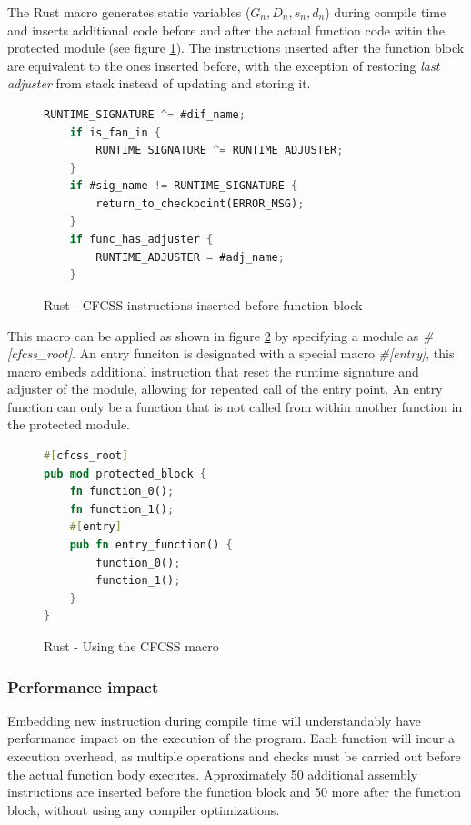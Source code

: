 The Rust macro generates static variables ({$G_n, D_n, s_n, d_n$}) during compile time and inserts additional code before and after the actual function code witin the protected module (see figure \ref{fig:rust_cfcss_macro}). The instructions inserted after the function block are equivalent to the ones inserted before, with the exception of restoring \textit{last adjuster} from stack instead of updating and storing it.

\begin{figure}[!h]
    \begin{lstlisting}[language=Rust]
    RUNTIME_SIGNATURE ^= #dif_name;
    if is_fan_in {
        RUNTIME_SIGNATURE ^= RUNTIME_ADJUSTER;
    }
    if #sig_name != RUNTIME_SIGNATURE {
        return_to_checkpoint(ERROR_MSG);
    }
    if func_has_adjuster {
        RUNTIME_ADJUSTER = #adj_name;
    }
    \end{lstlisting}
    \caption{Rust - CFCSS instructions inserted before function block}
    \label{fig:rust_cfcss_macro}
    \end{figure}

This macro can be applied as shown in figure \ref{fig:rust_cfcss_macro_example} by specifying a module as \textit{\#[cfcss\_root]}. An entry funciton is designated with a special macro \textit{\#[entry]}, this macro embeds additional instruction that reset the runtime signature and adjuster of the module, allowing for repeated call of the entry point. An entry function can only be a function that is not called from within another function in the protected module.

\begin{figure}[!h]
\begin{lstlisting}[language=Rust]
#[cfcss_root]
pub mod protected_block {
    fn function_0();
    fn function_1();
    #[entry]
    pub fn entry_function() {
        function_0();
        function_1();
    }
}
\end{lstlisting}
\caption{Rust - Using the CFCSS macro}
\label{fig:rust_cfcss_macro_example}
\end{figure}

\subsubsection{Performance impact}

Embedding new instruction during compile time will understandably have performance impact on the execution of the program. Each function will incur a execution overhead, as multiple operations and checks must be carried out before the actual function body executes. Approximately 50 additional assembly instructions are inserted before the function block and 50 more after the function block, without using any compiler optimizations.

